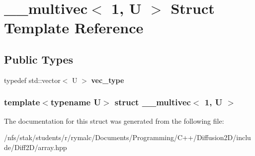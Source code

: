 \hypertarget{struct____multivec_3_011_00_01U_01_4}{
\section{\_\-\_\-multivec$<$ 1, U $>$ Struct Template Reference}
\label{struct____multivec_3_011_00_01U_01_4}
}
\subsection*{Public Types}
\begin{DoxyCompactItemize}
\item 
\hypertarget{struct____multivec_3_011_00_01U_01_4_abdf795a9397affa66935fdcc0f011188}{
typedef std::vector$<$ U $>$ {\bfseries vec\_\-type}}
\label{struct____multivec_3_011_00_01U_01_4_abdf795a9397affa66935fdcc0f011188}

\end{DoxyCompactItemize}
\subsubsection*{template$<$typename U$>$ struct \_\-\_\-multivec$<$ 1, U $>$}



The documentation for this struct was generated from the following file:\begin{DoxyCompactItemize}
\item 
/nfs/stak/students/r/rymalc/Documents/Programming/C++/Diffusion2D/include/Diff2D/array.hpp\end{DoxyCompactItemize}

